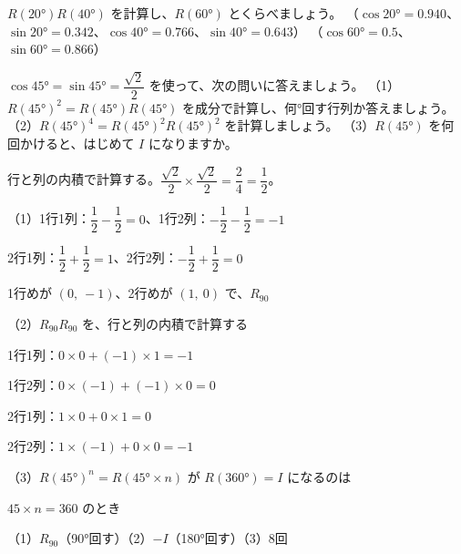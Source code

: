 \begin{jibun}
$R(20°)R(40°)$ を計算し、$R(60°)$ とくらべましょう。\newline
（$\cos20°=0.940$、$\sin20°=0.342$、$\cos40°=0.766$、$\sin40°=0.643$）\newline
（$\cos60°=0.5$、$\sin60°=0.866$）
\end{jibun}

\begin{reidai}[同じ回転をくり返す]
$\cos45°=\sin45°=\dfrac{\sqrt2}{2}$ を使って、次の問いに答えましょう。\newline
（1）\nobreak $R(45°)^2=R(45°)R(45°)$ を成分で計算し、何°回す行列か答えましょう。\newline
（2）\nobreak $R(45°)^4=R(45°)^2R(45°)^2$ を計算しましょう。\newline
（3）\nobreak $R(45°)$ を何回かけると、はじめて $I$ になりますか。\par
\kangaekata 行と列の内積で計算する。$\dfrac{\sqrt2}{2}\times\dfrac{\sqrt2}{2}=\dfrac{2}{4}=\dfrac12$。\par
\shiki （1）\nobreak 1行1列：$\dfrac12-\dfrac12=0$、1行2列：$-\dfrac12-\dfrac12=-1$\par
\kviigq \phantom{（1）}2行1列：$\dfrac12+\dfrac12=1$、2行2列：$-\dfrac12+\dfrac12=0$\par
\kviigq \phantom{（1）}1行めが $(0,\ -1)$、2行めが $(1,\ 0)$ で、$R_{90}$\par
\kviigq （2）\nobreak $R_{90}R_{90}$ を、行と列の内積で計算する\par
\kviigq \phantom{（2）}1行1列：$0\times0+(-1)\times1=-1$\par
\kviigq \phantom{（2）}1行2列：$0\times(-1)+(-1)\times0=0$\par
\kviigq \phantom{（2）}2行1列：$1\times0+0\times1=0$\par
\kviigq \phantom{（2）}2行2列：$1\times(-1)+0\times0=-1$\par
\kviigq （3）\nobreak $R(45°)^n=R(45°\times n)$ が $R(360°)=I$ になるのは\par
\kviigq \phantom{（3）}$45\times n=360$ のとき\par
\kotae （1）\nobreak $R_{90}$（90°回す）\quad（2）\nobreak $-I$（180°回す）\quad（3）\nobreak 8回
\end{reidai}

